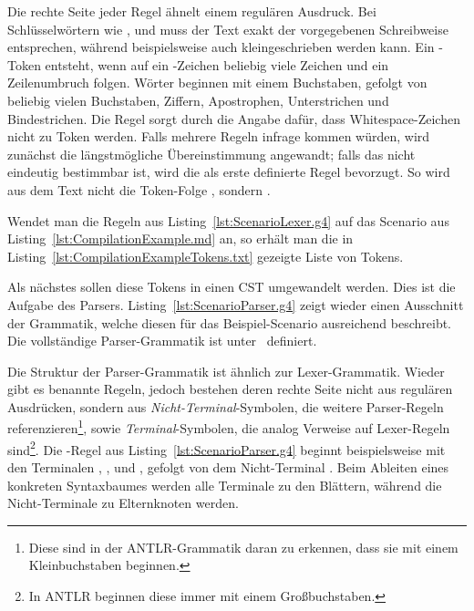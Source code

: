 Die rechte Seite jeder Regel ähnelt einem regulären Ausdruck.
Bei Schlüsselwörtern wie ,  und  muss der Text exakt der vorgegebenen Schreibweise entsprechen, während  beispielsweise auch kleingeschrieben werden kann.
Ein -Token entsteht, wenn auf ein \code{#}-Zeichen beliebig viele Zeichen und ein Zeilenumbruch folgen.
Wörter beginnen mit einem Buchstaben, gefolgt von beliebig vielen Buchstaben, Ziffern, Apostrophen, Unterstrichen und Bindestrichen.
Die Regel  sorgt durch die Angabe  dafür, dass Whitespace-Zeichen nicht zu Token werden.
Falls mehrere Regeln infrage kommen würden, wird zunächst die längstmögliche Übereinstimmung angewandt;
falls das nicht eindeutig bestimmbar ist, wird die als erste definierte Regel bevorzugt.
So wird aus dem Text  nicht die Token-Folge , sondern .

Wendet man die Regeln aus Listing~\ref{lst:ScenarioLexer.g4} auf das Scenario aus Listing~\ref{lst:CompilationExample.md} an, so erhält man die in Listing~\ref{lst:CompilationExampleTokens.txt} gezeigte Liste von Tokens.


Als nächstes sollen diese Tokens in einen CST umgewandelt werden.
Dies ist die Aufgabe des Parsers.
Listing~\ref{lst:ScenarioParser.g4} zeigt wieder einen Ausschnitt der Grammatik, welche diesen für das Beispiel-Scenario ausreichend beschreibt.
Die vollständige Parser-Grammatik ist unter~\cite{parser-grammar} definiert.


Die Struktur der Parser-Grammatik ist ähnlich zur Lexer-Grammatik.
Wieder gibt es benannte Regeln, jedoch bestehen deren rechte Seite nicht aus regulären Ausdrücken, sondern aus \emph{Nicht-Terminal}-Symbolen, die weitere Parser-Regeln referenzieren\footnote{Diese sind in der ANTLR-Grammatik daran zu erkennen, dass sie mit einem Kleinbuchstaben beginnen.}, sowie \emph{Terminal}-Symbolen, die analog Verweise auf Lexer-Regeln sind\footnote{In ANTLR beginnen diese immer mit einem Großbuchstaben.}.
Die -Regel aus Listing~\ref{lst:ScenarioParser.g4} beginnt beispielsweise mit den Terminalen , ,  und , gefolgt von dem Nicht-Terminal .
Beim Ableiten eines konkreten Syntaxbaumes werden alle Terminale zu den Blättern, während die Nicht-Terminale zu Elternknoten werden.

